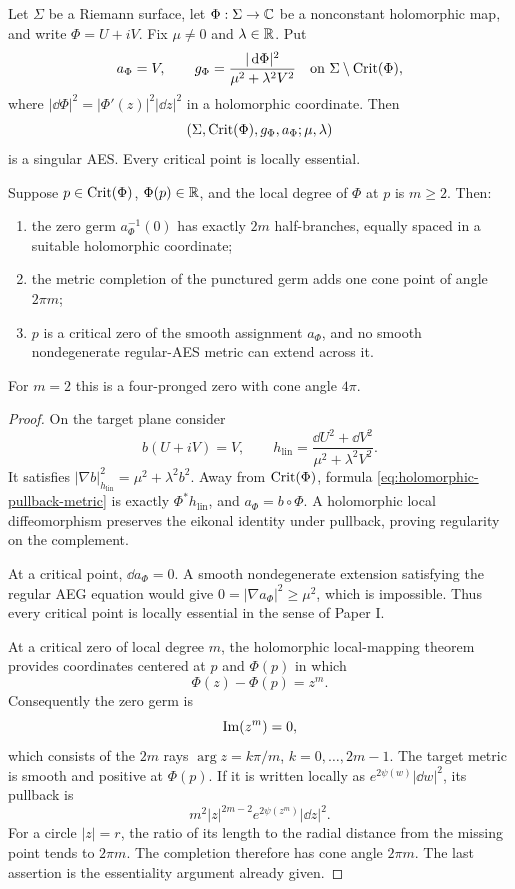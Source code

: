 \begin{theorem}
\label{thm:branched-pullback-zero-germ}
Let $\Sigma$ be a Riemann surface, let $\Phi:\Sigma\to\mathbb{C}$ be a nonconstant
holomorphic map, and write $\Phi=U+iV$.  Fix $\mu\ne0$ and $\lambda\in\mathbb{R}$.  Put
\begin{equation}
 a_\Phi=V,
 \qquad
 g_\Phi=
 \frac{|\,\mathrm{d}\Phi|^2}{\mu^2+\lambda^2V^2}
 \quad\text{on }\Sigma\setminus\operatorname{Crit}(\Phi),
 \label{eq:holomorphic-pullback-metric}
\end{equation}
where $|\dd\Phi|^2=|\Phi'(z)|^2|\dd z|^2$ in a holomorphic coordinate.
Then
\[
 (\Sigma,\operatorname{Crit}(\Phi),g_\Phi,a_\Phi;\mu,\lambda)
\]
is a singular AES.  Every critical point is locally essential.

Suppose $p\in\operatorname{Crit}(\Phi)$, $\Phi(p)\in\mathbb{R}$, and the local degree of $\Phi$ at
$p$ is $m\ge2$.  Then:
\begin{enumerate}
\item the zero germ $a_\Phi^{-1}(0)$ has exactly $2m$ half-branches, equally
spaced in a suitable holomorphic coordinate;
\item the metric completion of the punctured germ adds one cone point of angle
$2\pi m$;
\item $p$ is a critical zero of the smooth assignment $a_\Phi$, and no smooth
nondegenerate regular-AES metric can extend across it.
\end{enumerate}
For $m=2$ this is a four-pronged zero with cone angle $4\pi$.
\end{theorem}

\begin{proof}
On the target plane consider
\[
 b(U+iV)=V,
 \qquad
 h_{\mathrm{lin}}=
 \frac{\dd U^2+\dd V^2}{\mu^2+\lambda^2V^2}.
\]
It satisfies
$|\nabla b|_{h_{\mathrm{lin}}}^2=\mu^2+\lambda^2b^2$.
Away from $\operatorname{Crit}(\Phi)$, formula
\eqref{eq:holomorphic-pullback-metric} is exactly $\Phi^*h_{\mathrm{lin}}$,
and $a_\Phi=b\circ\Phi$.  A holomorphic local diffeomorphism preserves the
eikonal identity under pullback, proving regularity on the complement.

At a critical point, $\dd a_\Phi=0$.  A smooth nondegenerate extension satisfying
the regular AEG equation would give
$0=|\nabla a_\Phi|^2\ge\mu^2$, which is impossible.  Thus every critical point is
locally essential in the sense of Paper I.

At a critical zero of local degree $m$, the holomorphic local-mapping theorem
provides coordinates centered at $p$ and $\Phi(p)$ in which
\[
 \Phi(z)-\Phi(p)=z^m.
\]
Consequently the zero germ is
\[
 \operatorname{Im}(z^m)=0,
\]
which consists of the $2m$ rays
$\arg z=k\pi/m$, $k=0,\ldots,2m-1$.
The target metric is smooth and positive at $\Phi(p)$.  If it is written locally
as $e^{2\psi(w)}|\dd w|^2$, its pullback is
\[
 m^2|z|^{2m-2}e^{2\psi(z^m)}|\dd z|^2.
\]
For a circle $|z|=r$, the ratio of its length to the radial distance from the
missing point tends to $2\pi m$.  The completion therefore has cone angle
$2\pi m$.  The last assertion is the essentiality argument already given.
\end{proof}

